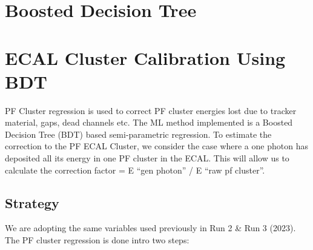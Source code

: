 




\section{Boosted Decision Tree}
\section{ECAL Cluster Calibration Using BDT}

PF Cluster regression is used to correct PF cluster energies lost due to tracker material, gaps, dead channels etc. The ML method implemented is a Boosted Decision Tree (BDT) based semi-parametric regression. To estimate the correction to the PF ECAL Cluster, we consider the case where a one photon has deposited all its energy in one PF cluster in the ECAL. This will allow us to calculate the correction factor = E “gen photon” / E “raw pf cluster”. 

\subsection{Strategy}

We are adopting the same variables used previously in Run 2 & Run 3 (2023). The PF cluster regression is done intro two steps:  

